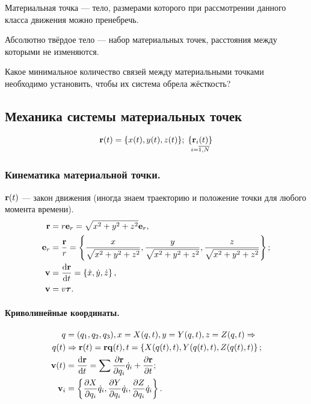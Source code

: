 \documentclass[12pt, a4paper]{article}
\begin{document}
\begin{dfn}
Материальная точка --- тело, размерами которого при рассмотрении данного класса движения можно пренебречь.
\end{dfn}
\begin{dfn}
Абсолютно твёрдое тело --- набор материальных точек, расстояния между которыми не изменяются.
\end{dfn}

\begin{task} Какое минимальное количество связей между материальными точками необходимо установить, чтобы их система обрела жёсткость? \end{task}

\subsection{Механика системы материальных точек}
\begin{equation*}
\vb{r}(t) = \{x(t), y(t), z(t) \}; \thickspace \mathop{\{\vb{r}_i(t)\}}\limits_{i = \overline{1{,}N}}
\end{equation*}  

\subsubsection{Кинематика материальной точки.}
$\vb{r}(t)$ --- закон движения (иногда знаем траекторию и положение точки для любого момента времени). 
\begin{align*}
\vb{r} &= r \vb{e}_r = \sqrt{x^2 + y^2 + z^2} \vb{e}_r, \\
\vb{e}_r &= \frac{\vb{r}}{r} = \left\{ \frac{x}{\sqrt{x^2 + y^2 + z^2}}, \frac{y}{\sqrt{x^2 + y^2 + z^2}}, \frac{z}{\sqrt{x^2 + y^2 + z^2}} \right\};\\
\vb{v} &= \dv{\vb{r}}{t} = \left\{\dot x, \dot y, \dot z\right\},\\
\vb{v} &= v \vb*{\tau}.
\end{align*}

\paragraph{Криволинейные координаты.}
\begin{align*}
q &= (q_1, q_2, q_3), x =X(q, t), y = Y(q, t), z =Z(q, t) \Rightarrow \\
q(t) &\Rightarrow \vb{r}(t) = \vb{r}{\vb{q}(t), t} = \left\{X(q(t), t), Y(q(t), t), Z(q(t), t)\right\}; \\
\vb{v}(t) &= \dv{\vb{r}}{t} = \sum \pdv{\vb{r}}{q_i} \dot q_i + \pdv{\vb{r}}{t}; \\
\vb{v}_i &= \left\{\pdv{X}{q_i} \dot q_i, \pdv{Y}{q_i} \dot q_i, \pdv{Z}{q_i} \dot q_i \right\}.
\end{align*}
\end{document}
